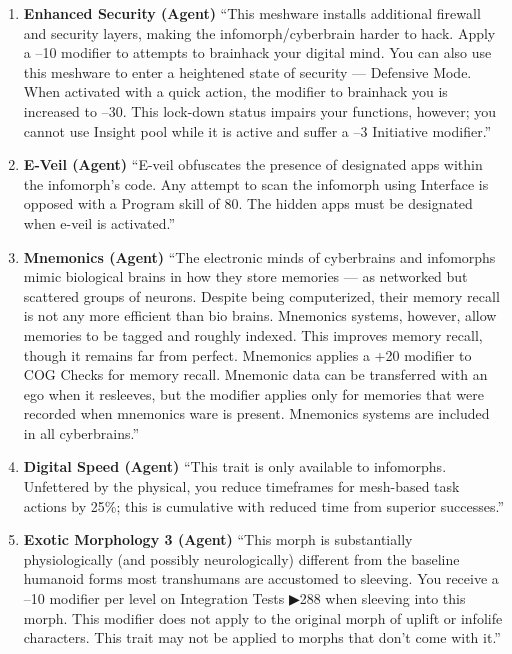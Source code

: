 \begin{enumerate}
    \item \textbf{Enhanced Security (Agent)} “This meshware installs additional firewall and security layers, making the infomorph/cyberbrain harder to hack. Apply a –10 modifier to attempts to brainhack your digital mind. You can also use this meshware to enter a heightened state of security — Defensive Mode. When activated with a quick action, the modifier to brainhack you is increased to –30. This lock-down status impairs your functions, however; you cannot use Insight pool while it is active and suffer a –3 Initiative modifier.” \citep[pg. 326]{ep2e_1.1_2019}

    \item \textbf{E-Veil (Agent)} “E-veil obfuscates the presence of designated apps within the infomorph’s code. Any attempt to scan the infomorph using Interface is opposed with a Program skill of 80. The hidden apps must be designated when e-veil is activated.” \citep[pg. 326]{ep2e_1.1_2019}

    \item \textbf{Mnemonics (Agent)} “The electronic minds of cyberbrains and infomorphs mimic biological brains in how they store memories — as networked but scattered groups of neurons. Despite being computerized, their memory recall is not any more efficient than bio brains. Mnemonics systems, however, allow memories to be tagged and roughly indexed. This improves memory recall, though it remains far from perfect. Mnemonics applies a +20 modifier to COG Checks for memory recall. Mnemonic data can be transferred with an ego when it resleeves, but the modifier applies only for memories that were recorded when mnemonics ware is present. Mnemonics systems are included in all cyberbrains.” \citep[pg. 316]{ep2e_1.1_2019}

    \item \textbf{Digital Speed (Agent)} “This trait is only available to infomorphs. Unfettered by the physical, you reduce timeframes for mesh-based task actions by 25\%; this is cumulative with reduced time from superior successes.” \citep[pg. 73]{ep2e_1.1_2019}

    \item \textbf{Exotic Morphology 3 (Agent)} “This morph is substantially physiologically (and possibly neurologically) different from the baseline humanoid forms most transhumans are accustomed to sleeving. You receive a –10 modifier per level on Integration Tests ▶288 when sleeving into this morph. This modifier does not apply to the original morph of uplift or infolife characters. This trait may not be applied to morphs that don’t come with it.” \citep[pg. 78]{ep2e_1.1_2019}

\end{enumerate}


